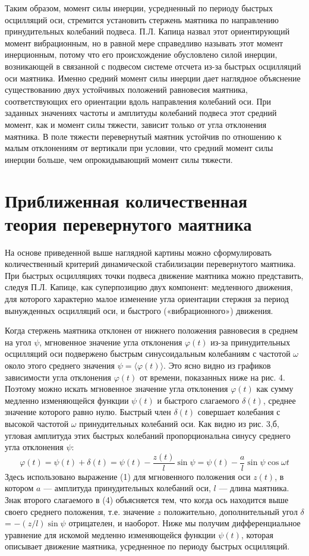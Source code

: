 \documentclass[a4paper,12pt]{article} %
\begin{document}
Таким образом, момент силы инерции, усредненный по периоду быстрых осцилляций оси, стремится установить стержень маятника по направлению принудительных колебаний подвеса. П.Л. Капица назвал этот ориентирующий момент вибрационным, но в равной мере справедливо называть этот момент инерционным, потому что его происхождение обусловлено силой инерции, возникающей в связанной с подвесом системе отсчета из-за быстрых осцилляций оси маятника. Именно средний момент силы инерции дает наглядное объяснение существованию двух устойчивых положений равновесия маятника, соответствующих его ориентации вдоль направления колебаний оси. При заданных значениях частоты и амплитуды колебаний подвеса этот средний момент, как и момент силы тяжести, зависит только от угла отклонения маятника. В поле тяжести перевернутый маятник устойчив по отношению к малым отклонениям от вертикали при условии, что средний момент силы инерции больше, чем опрокидывающий момент силы тяжести.
\section{Приближенная количественная теория перевернутого маятника}
На основе приведенной выше наглядной картины можно сформулировать количественный критерий динамической стабилизации перевернутого маятника. При быстрых осцилляциях точки подвеса движение маятника можно представить, следуя П.Л. Капице, как суперпозицию двух компонент: медленного движения, для которого характерно малое изменение угла ориентации стержня за период вынужденных осцилляций оси, и быстрого («вибрационного») движения.

Когда стержень маятника отклонен от нижнего положения равновесия в среднем на угол $\psi$, мгновенное значение угла отклонения $\varphi(t)$ из-за принудительных осцилляций оси подвержено быстрым синусоидальным колебаниям с частотой $\omega$ около этого среднего значения $\psi = \langle\varphi(t)\rangle$. Это ясно видно из графиков зависимости угла отклонения $\varphi(t)$ от времени, показанных ниже на рис. 4. Поэтому можно искать мгновенное значение угла отклонения $\varphi(t)$ как сумму медленно изменяющейся функции $\psi(t)$ и быстрого слагаемого $\delta(t)$, среднее значение которого равно нулю. Быстрый член $\delta(t)$ совершает колебания с высокой частотой $\omega$ принудительных колебаний оси. Как видно из рис. 3,б, угловая амплитуда этих быстрых колебаний пропорциональна синусу среднего угла отклонения $\psi$:
\begin{equation}
\varphi(t) = \psi(t) + \delta(t) = \psi(t) - \frac{z(t)}{l}\sin\psi = \psi(t) - \frac{a}{l}\sin\psi\cos\omega t
\end{equation}
Здесь использовано выражение (1) для мгновенного положения оси $z(t)$, в котором $a$ — амплитуда принудительных колебаний оси, $l$ — длина маятника. Знак второго слагаемого в (4) объясняется тем, что когда ось находится выше своего среднего положения, т.е. значение $z$ положительно, дополнительный угол $\delta$ = $-(z/l)\sin\psi$ отрицателен, и наоборот. Ниже мы получим дифференциальное уравнение для искомой медленно изменяющейся функции $\psi(t)$, которая описывает движение маятника, усредненное по периоду быстрых осцилляций.
\end{document}
